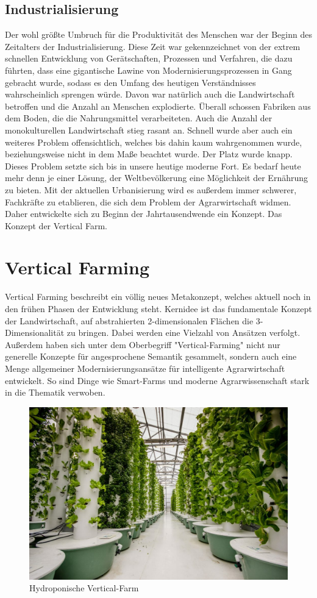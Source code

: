 \subsection{Industrialisierung}
Der wohl größte Umbruch für die Produktivität des Menschen war der Beginn des Zeitalters der Industrialisierung. Diese Zeit war gekennzeichnet von der extrem schnellen Entwicklung von Gerätschaften, Prozessen und Verfahren, die dazu führten, dass eine gigantische Lawine von Modernisierungsprozessen in Gang gebracht wurde, sodass es den Umfang des heutigen Verständnisses wahrscheinlich sprengen würde. Davon war natürlich auch die Landwirtschaft betroffen und die Anzahl an Menschen explodierte. Überall schossen Fabriken aus dem Boden, die die Nahrungsmittel verarbeiteten. Auch die Anzahl der monokulturellen Landwirtschaft stieg rasant an. Schnell wurde aber auch ein weiteres Problem offensichtlich, welches bis dahin kaum wahrgenommen wurde, beziehungsweise nicht in dem Maße beachtet wurde. Der Platz wurde knapp. Dieses Problem setzte sich bis in unsere heutige moderne Fort. Es bedarf heute mehr denn je einer Lösung, der Weltbevölkerung eine Möglichkeit der Ernährung zu bieten. Mit der aktuellen Urbanisierung wird es außerdem immer schwerer, Fachkräfte zu etablieren, die sich dem Problem der Agrarwirtschaft widmen. Daher entwickelte sich zu Beginn der Jahrtausendwende ein Konzept. Das Konzept der Vertical Farm.

\section{Vertical Farming}
Vertical Farming beschreibt ein völlig neues Metakonzept, welches aktuell noch in den frühen Phasen der Entwicklung steht. Kernidee ist das fundamentale Konzept der Landwirtschaft, auf abstrahierten 2-dimensionalen Flächen die 3-Dimensionalität zu bringen. Dabei werden eine Vielzahl von Ansätzen verfolgt. Außerdem haben sich unter dem Oberbegriff "Vertical-Farming" nicht nur generelle Konzepte für angesprochene Semantik gesammelt, sondern auch eine Menge allgemeiner Modernisierungsansätze für intelligente Agrarwirtschaft entwickelt. So sind Dinge wie Smart-Farms und moderne Agrarwissenschaft stark in die Thematik verwoben. 
\begin{figure}
    \centering
    \includegraphics[width=0.9\linewidth]{aeroponics-1200x800-1-1024x683.jpeg}
    \caption{Hydroponische Vertical-Farm}
    \label{fig:enter-label}
\end{figure}
